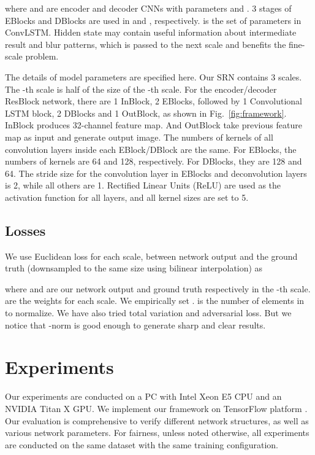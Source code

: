 \documentclass[10pt,twocolumn,letterpaper]{article}
\begin{document}
where  and  are encoder and decoder CNNs with parameters  and . 3 stages of EBlocks and DBlocks are used in  and , respectively.  is the set of parameters in ConvLSTM. Hidden state  may contain useful information about intermediate result and blur patterns, which is passed to the next scale and benefits the fine-scale problem.

The details of model parameters are specified here. Our SRN contains 3 scales. The -th scale is half of the size of the -th scale. For the encoder/decoder ResBlock network, there are 1 InBlock, 2 EBlocks, followed by 1 Convolutional LSTM block, 2 DBlocks and 1 OutBlock, as shown in Fig.~\ref{fig:framework}. InBlock produces 32-channel feature map. And OutBlock take previous feature map as input and generate output image. The numbers of kernels of all convolution layers inside each EBlock/DBlock are the same. For EBlocks, the numbers of kernels are 64 and 128, respectively. For DBlocks, they are 128 and 64. The stride size for the convolution layer in EBlocks and deconvolution layers is 2, while all others are 1. Rectified Linear Units (ReLU) are used as the activation function for all layers, and all kernel sizes are set to 5.

\subsection{Losses}
We use Euclidean loss for each scale, between network output and the ground truth (downsampled to the same size using bilinear interpolation) as

where  and  are our network output and ground truth respectively in the -th scale.  are the weights for each scale. We empirically set .  is the number of elements in  to normalize. We have also tried total variation and adversarial loss. But we notice that -norm is good enough to generate sharp and clear results.

\section{Experiments}\label{sec:exp}
Our experiments are conducted on a PC with Intel Xeon E5 CPU and an NVIDIA Titan X GPU. We implement our framework on TensorFlow platform \cite{tensorflow2015-whitepaper}. Our evaluation is comprehensive to verify different network structures, as well as various network parameters. For fairness, unless noted otherwise, all experiments are conducted on the same dataset with the same training configuration.
\end{document}

